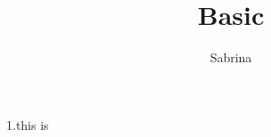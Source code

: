 \documentclass[11pt]{article}
\title{Basic}
\author{Sabrina}
\begin{document}
\maketitle
1.this is
\end{document}
